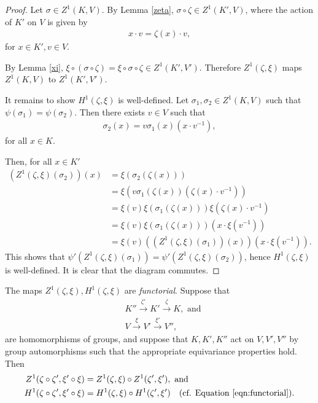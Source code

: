 \begin{proof}
	Let $\sigma \in Z^1(K, V)$. By Lemma \ref{zeta}, $\sigma \circ \zeta \in Z^1(K', V)$, where the action of $K'$ on $V$ is given by
	\begin{align*}
		x\cdot v = \zeta(x)\cdot v,
	\end{align*}
	for $x\in K', v\in V$.
	
	By Lemma \ref{xi}, $\xi \circ \left(\sigma \circ \zeta\right) = \xi \circ \sigma \circ \zeta \in Z^1(K', V')$. Therefore $Z^1(\zeta, \xi)$ maps $Z^1(K, V)$ to $Z^1(K', V')$.

	It remains to show $H^1(\zeta, \xi)$ is well-defined. Let $\sigma_1,\sigma_2 \in Z^1(K, V)$ such that $\psi(\sigma_1) = \psi(\sigma_2)$. Then there exists $v \in V$ such that
	\begin{align*}
		\sigma_2(x) = v\sigma_1(x)(x \cdot v^{-1}),
	\end{align*}
	for all $x \in K$.

	Then, for all $x \in K'$
	\begin{align*}
		\left(Z^1(\zeta, \xi)(\sigma_2)\right)(x) &= \xi\left(\sigma_2(\zeta(x))\right) \\
			&= \xi \left( v \sigma_1(\zeta(x))\left(\zeta(x) \cdot v^{-1}\right) \right) \\
			&= \xi(v) \xi(\sigma_1(\zeta(x))) \xi\left( \zeta(x) \cdot v^{-1}\right) \\
			&= \xi(v) \xi(\sigma_1(\zeta(x)))\left(x \cdot \xi(v^{-1})\right) \\
			&= \xi(v) \left(\left(Z^1(\zeta, \xi)(\sigma_1)\right)(x)\right) \left(x \cdot \xi(v^{-1})\right).
	\end{align*}
	This shows that $\psi'\left(Z^1(\zeta, \xi)(\sigma_1)\right) = \psi'\left(Z^1(\zeta, \xi)(\sigma_2)\right)$, hence $H^1(\zeta, \xi)$ is well-defined. It is clear that the diagram commutes.
\end{proof} 
\begin{remark} \label{maps_functorial}
 The maps $Z^1(\zeta, \xi), H^1(\zeta, \xi)$ are \emph{functorial}. Suppose that
\begin{align*}
	&K'' \stackrel{\zeta'}\longrightarrow K' \stackrel{\zeta}\longrightarrow K, \textrm{ and} \\
	&V \stackrel{\xi}\longrightarrow V' \stackrel{\xi'}\longrightarrow V'',
\end{align*}
are homomorphisms of groups, and suppose that $K, K', K''$ act on $V, V', V''$ by group automorphisms such that the appropriate equivariance properties hold. Then
\begin{align*}
Z^1(\zeta \circ \zeta', \xi' \circ \xi) &= Z^1(\zeta, \xi) \circ Z^1(\zeta', \xi'), \textrm{ and} \\
H^1(\zeta \circ \zeta', \xi' \circ \xi) &= H^1(\zeta, \xi) \circ H^1(\zeta', \xi')\quad(\textrm{cf. Equation \ref{eqn:functorial}}).
\end{align*}
\end{remark}
